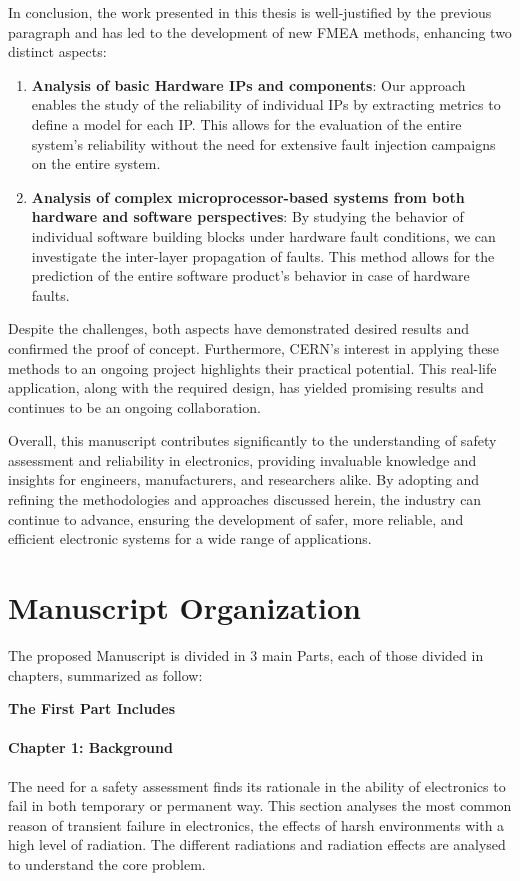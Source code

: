\documentclass[./dissertation.tex]{subfiles}
\begin{document}
In conclusion, the work presented in this thesis is well-justified by the previous paragraph and has led to the development of new FMEA methods, enhancing two distinct aspects:

\begin{enumerate}
\item \textbf{Analysis of basic Hardware IPs and components}: Our approach enables the study of the reliability of individual IPs by extracting metrics to define a model for each IP. This allows for the evaluation of the entire system's reliability without the need for extensive fault injection campaigns on the entire system.
\item \textbf{Analysis of complex microprocessor-based systems from both hardware and software perspectives}: By studying the behavior of individual software building blocks under hardware fault conditions, we can investigate the inter-layer propagation of faults. This method allows for the prediction of the entire software product's behavior in case of hardware faults.
\end{enumerate}

Despite the challenges, both aspects have demonstrated desired results and confirmed the proof of concept. Furthermore, CERN's interest in applying these methods to an ongoing project highlights their practical potential. This real-life application, along with the required design, has yielded promising results and continues to be an ongoing collaboration.

Overall, this manuscript contributes significantly to the understanding of safety assessment and reliability in electronics, providing invaluable knowledge and insights for engineers, manufacturers, and researchers alike. By adopting and refining the methodologies and approaches discussed herein, the industry can continue to advance, ensuring the development of safer, more reliable, and efficient electronic systems for a wide range of applications.



\section{Manuscript Organization}
The proposed Manuscript is divided in 3 main Parts, each of those divided in chapters, summarized as follow:


\noindent\textbf{The First Part Includes}


\paragraph{Chapter 1: Background}
The need for a safety assessment finds its rationale in the ability of electronics to fail in both temporary or permanent way. This section analyses the most common reason of transient failure in electronics, the effects of harsh environments with a high level of radiation. The different radiations and radiation effects are analysed to understand the core problem.
\end{document}
